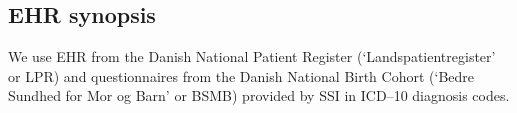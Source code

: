 \subsection*{EHR synopsis}

We use EHR from the Danish National Patient Register (`Landspatientregister' or LPR) and questionnaires from the Danish National Birth Cohort (`Bedre Sundhed for Mor og Barn' or BSMB) provided by SSI in ICD--10 diagnosis codes.

